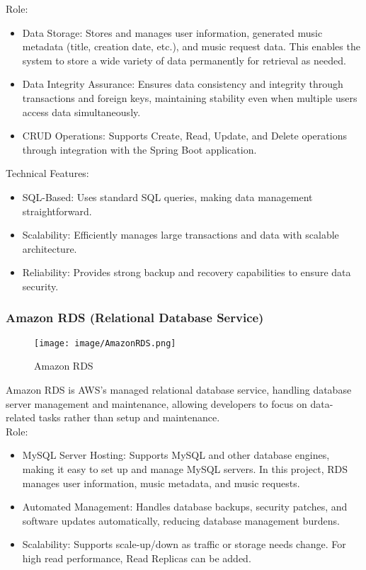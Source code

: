 \documentclass[conference]{IEEEtran}
\begin{document}
Role:
\begin{itemize}
    \item Data Storage: Stores and manages user information, generated music metadata (title, creation date, etc.), and music request data. This enables the system to store a wide variety of data permanently for retrieval as needed.\\
    \item Data Integrity Assurance: Ensures data consistency and integrity through transactions and foreign keys, maintaining stability even when multiple users access data simultaneously.\\
    \item CRUD Operations: Supports Create, Read, Update, and Delete operations through integration with the Spring Boot application.\\
\end{itemize}

Technical Features:
\begin{itemize}
\item SQL-Based: Uses standard SQL queries, making data management straightforward.\\
\item Scalability: Efficiently manages large transactions and data with scalable architecture.\\
\item Reliability: Provides strong backup and recovery capabilities to ensure data security.\\
\end{itemize}

\subsubsection{Amazon RDS (Relational Database Service)}

\begin{figure}[h!]
    \centering
    \texttt{[image: image/AmazonRDS.png]}
    \caption{Amazon RDS}
    \label{fig:enter-label}
\end{figure}

\noindent Amazon RDS is AWS’s managed relational database service, handling database server management and maintenance, allowing developers to focus on data-related tasks rather than setup and maintenance.\\

Role: 
\begin{itemize}
    \item MySQL Server Hosting: Supports MySQL and other database engines, making it easy to set up and manage MySQL servers. In this project, RDS manages user information, music metadata, and music requests.\\
    \item Automated Management: Handles database backups, security patches, and software updates automatically, reducing database management burdens.\\
    \item Scalability: Supports scale-up/down as traffic or storage needs change. For high read performance, Read Replicas can be added.\\
\end{itemize}
\end{document}
